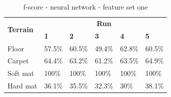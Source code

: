 \documentclass[USenglish]{ifimaster}  %
\begin{document}
\begin{table}[h]\ContinuedFloat
	\begin{subtable}[h]{1\textwidth}
		\centering
		\captionsetup{justification=centering}
		\begin{tabular}{@{}llllll@{}}
			\toprule
			\multirow{2}{*}{\textbf{Terrain}} & \multicolumn{5}{c}{\textbf{Run}} \\ \cmidrule(l){2-6} 
			& \multicolumn{1}{l|}{\textbf{1}} & \multicolumn{1}{l|}{\textbf{2}} & \multicolumn{1}{l|}{\textbf{3}} & \multicolumn{1}{l|}{\textbf{4}} & \textbf{5} \\ \midrule
			\multicolumn{1}{l|}{Floor} & \multicolumn{1}{l|}{57.5\%} & \multicolumn{1}{l|}{60.5\%} & \multicolumn{1}{l|}{49.4\%} & \multicolumn{1}{l|}{62.8\%} & 60.5\% \\ \midrule
			\multicolumn{1}{l|}{Carpet} & \multicolumn{1}{l|}{64.4\%} & \multicolumn{1}{l|}{63.2\%} & \multicolumn{1}{l|}{61.2\%} & \multicolumn{1}{l|}{63.5\%} & 64.9\% \\ \midrule
			\multicolumn{1}{l|}{Soft mat} & \multicolumn{1}{l|}{100\%} & \multicolumn{1}{l|}{100\%} & \multicolumn{1}{l|}{100\%} & \multicolumn{1}{l|}{100\%} & 100\% \\ \midrule
			\multicolumn{1}{l|}{Hard mat} & \multicolumn{1}{l|}{36.1\%} & \multicolumn{1}{l|}{35.5\%} & \multicolumn{1}{l|}{32.3\%} & \multicolumn{1}{l|}{30\%} & 38.1\% \\ \bottomrule
		\end{tabular}
		\caption{f-score - neural network - feature set one}
		\label{nnfscore}
	\end{subtable}
\end{table}
\end{document}
